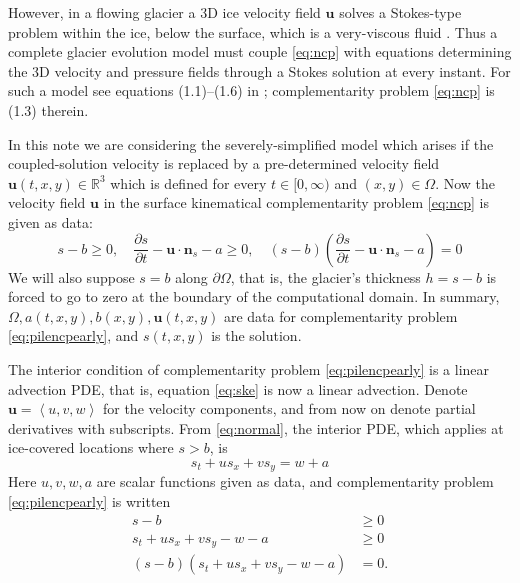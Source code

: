 \documentclass[hidelinks,onefignum,onetabnum,final]{siamart220329}  %
\newcommand{\bn}{\mathbf{n}}
\newcommand{\bu}{\mathbf{u}}
\newcommand{\RR}{\mathbb{R}}
\begin{document}
However, in a flowing glacier a 3D ice velocity field $\bu$ solves a Stokes-type problem within the ice, below the surface, which is a very-viscous fluid \cite{GreveBlatter2009}.  Thus a complete glacier evolution model must couple \eqref{eq:ncp} with equations determining the 3D velocity and pressure fields through a Stokes solution at every instant.  For such a model see equations (1.1)--(1.6) in \cite{Bueler2025}; complementarity problem \eqref{eq:ncp} is (1.3) therein.

In this note we are considering the severely-simplified model which arises if the coupled-solution velocity is replaced by a pre-determined velocity field $\bu(t,x,y) \in \RR^3$ which is defined for every $t\in [0,\infty)$ and $(x,y)\in\Omega$.  Now the velocity field $\bu$ in the surface kinematical complementarity problem \eqref{eq:ncp} is given as data:
\begin{equation}
s - b \ge 0, \quad
\frac{\partial s}{\partial t} - \bu \cdot \bn_s - a \ge 0, \quad
(s - b) \left(\frac{\partial s}{\partial t} - \bu \cdot \bn_s - a\right) = 0  \label{eq:pilencpearly}
\end{equation}
We will also suppose $s=b$ along $\partial \Omega$, that is, the glacier's thickness $h=s-b$ is forced to go to zero at the boundary of the computational domain.  In summary, $\Omega,a(t,x,y),b(x,y),\bu(t,x,y)$ are data for complementarity problem \eqref{eq:pilencpearly}, and $s(t,x,y)$ is the solution.

The interior condition \cite{KinderlehrerStampacchia1980} of complementarity problem \eqref{eq:pilencpearly} is a linear advection PDE, that is, equation \eqref{eq:ske} is now a linear advection.  Denote $\bu=\left<u,v,w\right>$ for the velocity components, and from now on denote partial derivatives with subscripts.  From \eqref{eq:normal}, the interior PDE, which applies at ice-covered locations where $s>b$, is
\begin{equation}
s_t + u s_x + v s_y = w + a \label{eq:pilepde}
\end{equation}
Here $u,v,w,a$ are scalar functions given as data, and complementarity problem \eqref{eq:pilencpearly} is written
\begin{subequations}
\label{eq:pilencp}
\begin{align}
s - b &\ge 0 \\
s_t + u s_x + v s_y - w - a &\ge 0 \\
(s - b) \left(s_t + u s_x + v s_y - w - a\right) &= 0.
\end{align}
\end{subequations}
\end{document}
